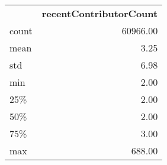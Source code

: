 \begin{tabular}{lr}
 & \textbf{recentContributorCount} \\
count & 60966.00 \\
mean & 3.25 \\
std & 6.98 \\
min & 2.00 \\
25\% & 2.00 \\
50\% & 2.00 \\
75\% & 3.00 \\
max & 688.00 \\
\end{tabular}
